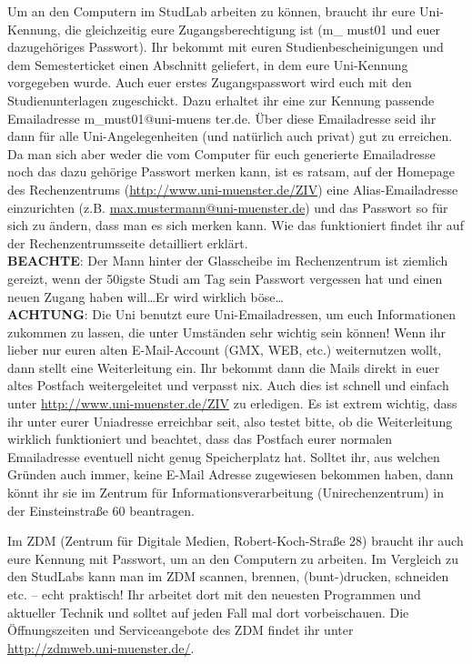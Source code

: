 Um an den Computern im StudLab arbeiten zu können, braucht ihr eure Uni-Kennung, die gleichzeitig eure Zugangsberechtigung ist (m\_ must01 und euer dazugehöriges Passwort). Ihr bekommt mit euren Studienbescheinigungen und dem Semesterticket einen Abschnitt geliefert, in dem eure Uni-Kennung vorgegeben wurde. Auch euer erstes Zugangspasswort wird euch mit den Studienunterlagen zugeschickt. Dazu erhaltet ihr eine zur Kennung passende Emailadresse m\_must01@uni-muens ter.de. Über diese Emailadresse seid ihr dann für alle Uni-Angelegenheiten (und natürlich auch privat) gut zu erreichen. Da man sich aber weder die vom Computer für euch generierte Emailadresse noch das dazu gehörige Passwort merken kann, ist es ratsam, auf der Homepage des Rechenzentrums (\url{http://www.uni-muenster.de/ZIV}) eine Alias-Emailadresse einzurichten (z.B. \url{max.mustermann@uni-muenster.de}) und das Passwort so für sich zu ändern, dass man es sich merken kann. Wie das funktioniert ﬁndet ihr auf der Rechenzentrumsseite detailliert erklärt.\\ \textbf{BEACHTE}: Der Mann hinter der Glasscheibe im Rechenzentrum ist ziemlich gereizt, wenn der 50igste Studi am Tag sein Passwort vergessen hat und einen neuen Zugang haben will\dots Er wird wirklich böse\dots \\
\textbf{ACHTUNG}: Die Uni benutzt eure Uni-Emailadressen, um euch Informationen zukommen zu lassen, die unter Umständen sehr wichtig sein können! Wenn ihr lieber nur euren alten E-Mail-Account (GMX, WEB, etc.) weiternutzen wollt, dann stellt eine Weiterleitung ein. Ihr bekommt dann die Mails direkt in euer altes Postfach weitergeleitet und verpasst nix. Auch dies ist schnell und einfach unter \url{http://www.uni-muenster.de/ZIV} zu erledigen. Es ist extrem wichtig, dass ihr unter eurer Uniadresse erreichbar seit, also testet bitte, ob die Weiterleitung wirklich funktioniert und beachtet, dass das Postfach eurer normalen Emailadresse eventuell nicht genug Speicherplatz hat. Solltet ihr, aus welchen Gründen auch immer, keine E-Mail Adresse zugewiesen bekommen haben, dann könnt ihr sie im Zentrum für Informationsverarbeitung (Unirechenzentrum) in der Einsteinstraße 60 beantragen.

Im ZDM (Zentrum für Digitale Medien, Robert-Koch-Straße 28) braucht ihr auch eure Kennung mit Passwort, um an den Computern zu arbeiten. Im Vergleich zu den StudLabs kann man im ZDM scannen, brennen, (bunt-)drucken, schneiden etc. – echt praktisch! Ihr arbeitet dort mit den neuesten Programmen und aktueller Technik und solltet auf jeden Fall mal dort vorbeischauen. Die Öffnungszeiten und Serviceangebote des ZDM findet ihr unter \url{http://zdmweb.uni-muenster.de/}.
